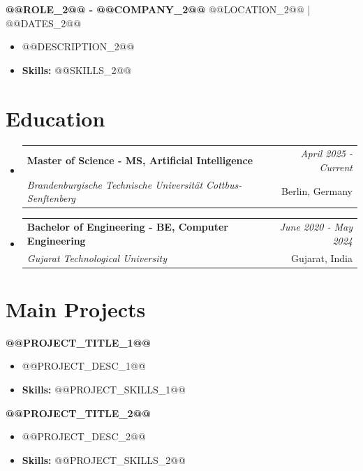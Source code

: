 \documentclass[a4paper,11pt]{article}
\makeatletter
\newcommand{\resumeSubheading}[4]{
\vspace{0.5mm}\item
    \begin{tabular*}{\linewidth}[t]{l@{\extracolsep{\fill}}r}
        \textbf{#1} & \textit{\footnotesize{#4}} \\
        \textit{\footnotesize{#3}} &  \footnotesize{#2}\\
    \end{tabular*}
    \vspace{-2.4mm}
}
\makeatother
\begin{document}
\vspace{1mm}
  \textbf{@@ROLE_2@@ - @@COMPANY_2@@} \hfill @@LOCATION_2@@ | @@DATES_2@@
\vspace{-1.5mm} %
\begin{itemize}
  \item @@DESCRIPTION_2@@
\vspace{-2mm}
  \item \textbf{Skills:} @@SKILLS_2@@
\end{itemize}\section{\textbf{Education}}
\vspace{-0.4mm}

\begin{itemize}[leftmargin=0.15in, label={}]
\resumeSubheading
{Master of Science - MS, Artificial Intelligence }{Berlin, Germany}
{Brandenburgische Technische Universität Cottbus-Senftenberg  }{April 2025 - Current}

\vspace{1.0mm} %
\resumeSubheading
{Bachelor of Engineering - BE, Computer Engineering  }{Gujarat, India}
{Gujarat Technological University }{June 2020 - May 2024}

\end{itemize}
\section{\textbf{Main Projects}}

\vspace{1mm}
  \textbf{@@PROJECT_TITLE_1@@  }
\vspace{-1.5mm} %
\begin{itemize}
  \item @@PROJECT_DESC_1@@
\vspace{-3mm}
  \item \textbf{Skills:} @@PROJECT_SKILLS_1@@
\end{itemize}


\vspace{1mm}
   \textbf{@@PROJECT_TITLE_2@@ }
\vspace{-1.5mm} %
\begin{itemize}
  \item @@PROJECT_DESC_2@@
\vspace{-3mm}
  \item \textbf{Skills:} @@PROJECT_SKILLS_2@@
\end{itemize}
\end{document}
